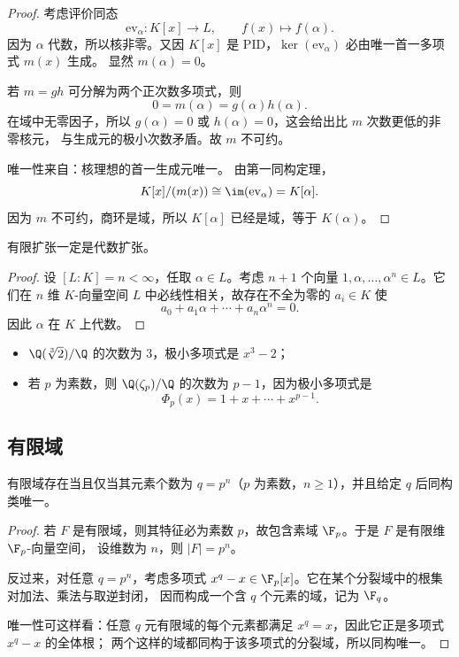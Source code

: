 \begin{proof}
考虑评价同态
\[
  \mathrm{ev}_\alpha\colon K[x]\to L,
  \qquad f(x)\mapsto f(\alpha).
\]
因为 $\alpha$ 代数，所以核非零。又因 $K[x]$ 是 PID，$\ker(\mathrm{ev}_\alpha)$ 必由唯一首一多项式 $m(x)$ 生成。
显然 $m(\alpha)=0$。

若 $m=gh$ 可分解为两个正次数多项式，则
\[
  0=m(\alpha)=g(\alpha)h(\alpha).
\]
在域中无零因子，所以 $g(\alpha)=0$ 或 $h(\alpha)=0$，这会给出比 $m$ 次数更低的非零核元，
与生成元的极小次数矛盾。故 $m$ 不可约。

唯一性来自：核理想的首一生成元唯一。
由第一同构定理，
\[
  K[x]/(m(x))\cong \im(\mathrm{ev}_\alpha)=K[\alpha].
\]
因为 $m$ 不可约，商环是域，所以 $K[\alpha]$ 已经是域，等于 $K(\alpha)$。
\end{proof}

\begin{proposition}
有限扩张一定是代数扩张。
\end{proposition}

\begin{proof}
设 $[L:K]=n<\infty$，任取 $\alpha\in L$。考虑 $n+1$ 个向量
$1,\alpha,\dots,\alpha^n\in L$。它们在 $n$ 维 $K$-向量空间 $L$ 中必线性相关，故存在不全为零的
$a_i\in K$ 使
\[
  a_0+a_1\alpha+\cdots+a_n\alpha^n=0.
\]
因此 $\alpha$ 在 $K$ 上代数。
\end{proof}

\begin{example}
\begin{itemize}
  \item $\Q(\sqrt[3]{2})/\Q$ 的次数为 $3$，极小多项式是 $x^3-2$；
  \item 若 $p$ 为素数，则 $\Q(\zeta_p)/\Q$ 的次数为 $p-1$，因为极小多项式是
  \[
    \Phi_p(x)=1+x+\cdots+x^{p-1}.
  \]
\end{itemize}
\end{example}

\subsection{有限域}

\begin{theorem}
有限域存在当且仅当其元素个数为 $q=p^n$（$p$ 为素数，$n\ge 1$），并且给定 $q$ 后同构类唯一。
\end{theorem}

\begin{proof}
若 $F$ 是有限域，则其特征必为素数 $p$，故包含素域 $\F_p$。于是 $F$ 是有限维 $\F_p$-向量空间，
设维数为 $n$，则 $|F|=p^n$。

反过来，对任意 $q=p^n$，考虑多项式 $x^q-x\in\F_p[x]$。它在某个分裂域中的根集对加法、乘法与取逆封闭，
因而构成一个含 $q$ 个元素的域，记为 $\F_q$。

唯一性可这样看：任意 $q$ 元有限域的每个元素都满足 $x^q=x$，因此它正是多项式 $x^q-x$ 的全体根；
两个这样的域都同构于该多项式的分裂域，所以同构唯一。
\end{proof}

